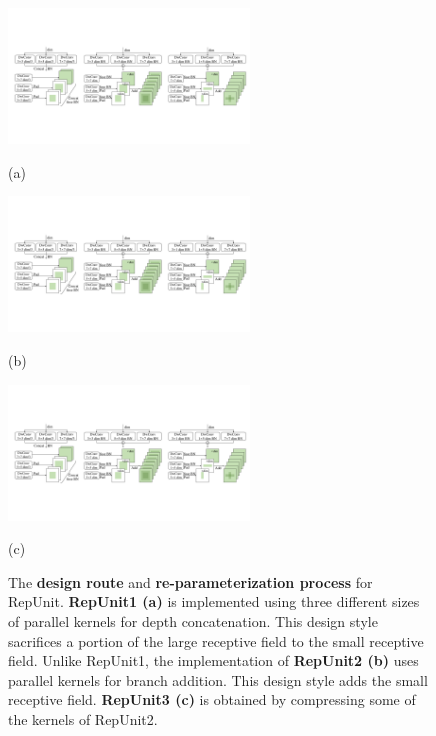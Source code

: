 \documentclass[preprint,12pt]{elsarticle}
\begin{document}
\begin{figure}[t]
  \centering
  \begin{minipage}{0.27\linewidth}
    \centering
    \includegraphics[height=3.6cm]{figs/fig2-a.pdf}
    \par
    (a)
    \label{fig:repunit1}
  \end{minipage}
  \hfill
  \begin{minipage}{0.34\linewidth}
    \centering
    \includegraphics[height=3.6cm]{figs/fig2-b.pdf}
    \par
    (b)
    \label{fig:repunit2}
  \end{minipage}
  \hfill
  \begin{minipage}{0.34\linewidth}
    \centering
    \includegraphics[height=3.6cm]{figs/fig2-c.pdf}
    \par
    (c)
    \label{fig:repunit3}
  \end{minipage}
  \caption{The \textbf{design route} and \textbf{re-parameterization process} for RepUnit. \textbf{RepUnit1 (a)} is implemented using three different sizes of parallel kernels for depth concatenation. This design style sacrifices a portion of the large receptive field to the small receptive field. Unlike RepUnit1, the implementation of \textbf{RepUnit2 (b)} uses parallel kernels for branch addition. This design style adds the small receptive field. \textbf{RepUnit3 (c)} is obtained by compressing some of the kernels of RepUnit2.}
  \label{fig:repunits}
\end{figure}
\end{document}
